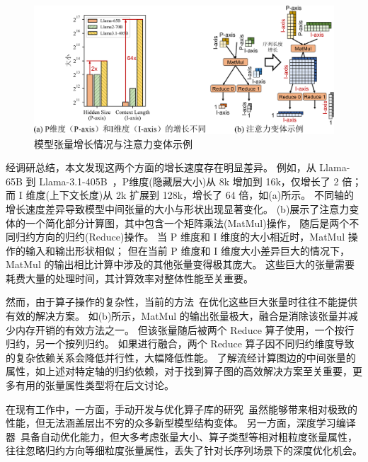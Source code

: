\begin{figure}[ht]
    \centering
    \includegraphics[width=0.85\linewidth]{figures/flashtensor/intro_workload-crop.pdf}
    \caption{模型张量增长情况与注意力变体示例}
    \label{fig:flashtensor-larger_workload}
\end{figure}

经调研总结，本文发现这两个方面的增长速度存在明显差异。
例如，从 Llama-65B 到 Llama-3.1-405B~\cite{touvron2023llama, touvron2023llama2, dubey2024llama3}，P维度(隐藏层大小)从 8k 增加到 16k，仅增长了 2 倍；
而 I 维度(上下文长度)从 2k 扩展到 128k，增长了 64 倍，如(a)所示。
不同轴的增长速度差异导致模型中间张量的大小与形状出现显著变化。
(b)展示了注意力变体的一个简化部分计算图，其中包含一个矩阵乘法(MatMul)操作，
随后是两个不同归约方向的归约(Reduce)操作。
当 P 维度和 I 维度的大小相近时，MatMul 操作的输入和输出形状相似；
但在当前 P 维度和 I 维度大小差异巨大的情况下，MatMul 的输出相比计算中涉及的其他张量变得极其庞大。
这些巨大的张量需要耗费大量的处理时间，其计算效率对整体性能至关重要。

然而，由于算子操作的复杂性，当前的方法~\cite{tensorrt, torchcompile, zheng2023einnet, chen2018tvm, hu2024korch}在优化这些巨大张量时往往不能提供有效的解决方案。
如(b)所示，MatMul 的输出张量极大，融合是消除该张量并减少内存开销的有效方法之一。
但该张量随后被两个 Reduce 算子使用，一个按行归约，另一个按列归约。
如果进行融合，两个 Reduce 算子因不同归约维度导致的复杂依赖关系会降低并行性，大幅降低性能。
了解流经计算图边的中间张量的属性，如上述对特定轴的归约依赖，对于找到算子图的高效解决方案至关重要，更多有用的张量属性类型将在后文讨论。

在现有工作中，一方面，手动开发与优化算子库的研究~\cite{dao2022flashattention, dao2023flashattention, shah2024flashattention, ye2025flashinfer}虽然能够带来相对极致的性能，但无法涵盖层出不穷的众多新型模型结构变体。
另一方面，深度学习编译器~\cite{niu2021dnnfusion, astitch, shi2023welder}具备自动优化能力，但大多考虑张量大小、算子类型等相对粗粒度张量属性，往往忽略归约方向等细粒度张量属性，丢失了针对长序列场景下的深度优化机会。

